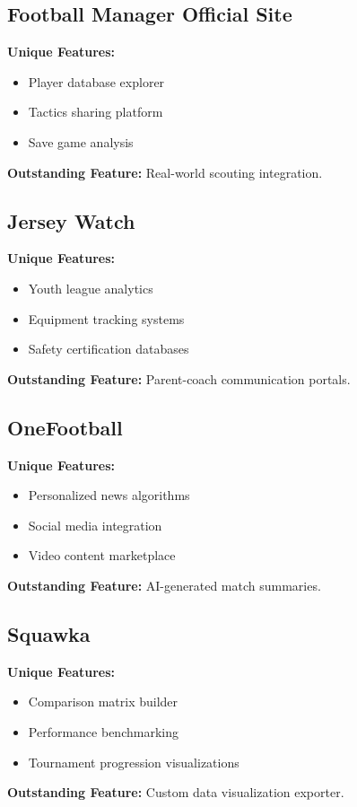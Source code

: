 \documentclass{report}
\begin{document}
\subsection{Football Manager Official Site}
\textbf{Unique Features:}
\begin{itemize}
    \item Player database explorer
    \item Tactics sharing platform
    \item Save game analysis
\end{itemize}
\textbf{Outstanding Feature:} Real-world scouting integration\citep{fm}.

\subsection{Jersey Watch}
\textbf{Unique Features:}
\begin{itemize}
    \item Youth league analytics
    \item Equipment tracking systems
    \item Safety certification databases
\end{itemize}
\textbf{Outstanding Feature:} Parent-coach communication portals\citep{jerseywatch}.

\subsection{OneFootball}
\textbf{Unique Features:}
\begin{itemize}
    \item Personalized news algorithms
    \item Social media integration
    \item Video content marketplace
\end{itemize}
\textbf{Outstanding Feature:} AI-generated match summaries\citep{onefootball}.

\subsection{Squawka}
\textbf{Unique Features:}
\begin{itemize}
    \item Comparison matrix builder
    \item Performance benchmarking
    \item Tournament progression visualizations
\end{itemize}
\textbf{Outstanding Feature:} Custom data visualization exporter\citep{squawka}.
\end{document}
